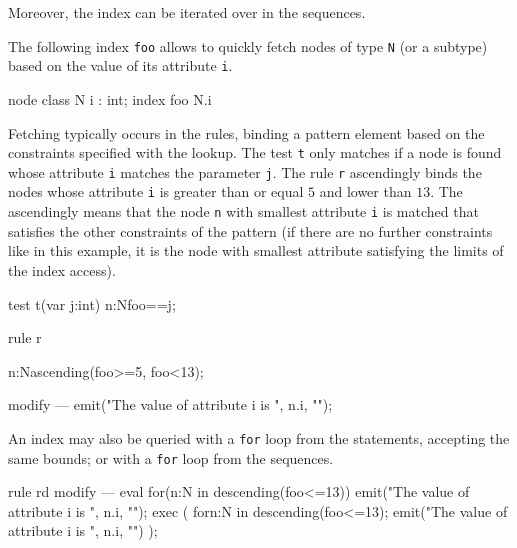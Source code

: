 Moreover, the index can be iterated over in the sequences.

\begin{example}
The following index \texttt{foo} allows to quickly fetch nodes of type \texttt{N} (or a subtype) based on the value of its attribute \texttt{i}.

\begin{grgen}
node class N {
  i : int;
}
index foo { N.i }
\end{grgen}

Fetching typically occurs in the rules, binding a pattern element based on the constraints specified with the lookup.
The test \texttt{t} only matches if a node is found whose attribute \texttt{i} matches the parameter \texttt{j}.
The rule \texttt{r} ascendingly binds the nodes whose attribute \texttt{i} is greater than or equal $5$ and lower than $13$.
The ascendingly means that the node \texttt{n} with smallest attribute \texttt{i} is matched that satisfies the other constraints of the pattern (if there are no further constraints like in this example, it is the node with smallest attribute satisfying the limits of the index access).

\begin{grgen}
test t(var j:int) {
  n:N{foo==j};	
}

rule r {
  n:N{ascending(foo>=5, foo<13)};

  modify {
  ---
    emit("The value of attribute i is ", n.i, "\n");
  }
}
\end{grgen}

An index may also be queried with a \texttt{for} loop from the statements, accepting the same bounds; 
or with a \texttt{for} loop from the sequences.

\begin{grgen}
rule rd {
  modify {
  ---
    eval {
      for(n:N in {descending(foo<=13)}) {
        emit("The value of attribute i is ", n.i, "\n");
      }
    }
    exec (
      for{n:N in {descending(foo<=13)}; {emit("The value of attribute i is ", n.i, "\n")} }
    );
  }
}
\end{grgen}

\end{example}

